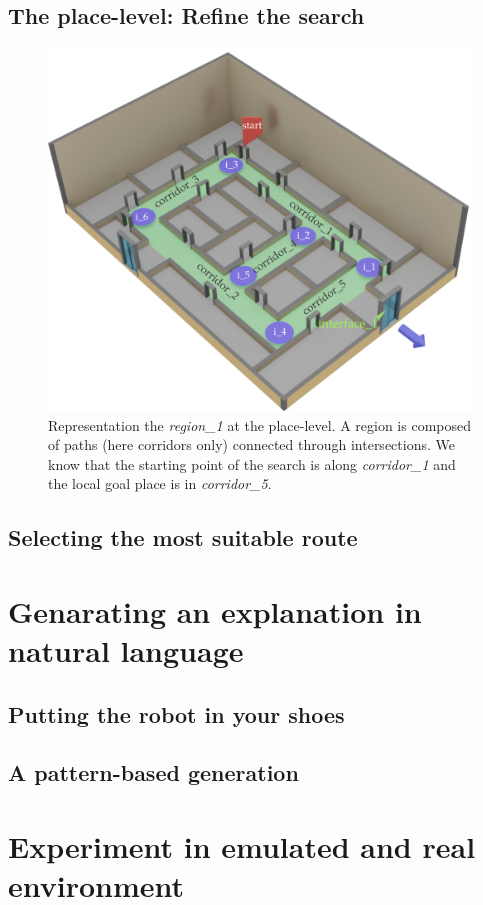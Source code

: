 \subsection{The place-level: Refine the search}

\begin{figure}[ht!]
\centering
\includegraphics[scale=0.28]{figures/chapter3/region1.png}
\caption{\label{fig:chap3_region1} Representation the \textit{region\_1} at the place-level. A region is composed of paths (here corridors only) connected through intersections. We know that the starting point of the search is along \textit{corridor\_1} and the local goal place is in \textit{corridor\_5}. }
\end{figure}

\subsection{Selecting the most suitable route}

\section{Genarating an explanation in natural language}

\subsection{Putting the robot in your shoes}

\subsection{A pattern-based generation}

\section{Experiment in emulated and real environment}



